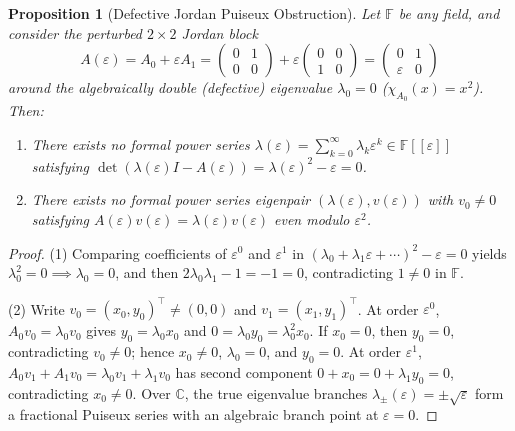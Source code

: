 \documentclass[11pt,a4paper]{article}
\newtheorem{proposition}[theorem]{Proposition}
\theoremstyle{definition}
\begin{document}
\begin{proposition}[Defective Jordan Puiseux Obstruction]\label{prop:defective}
Let $\mathbb{F}$ be any field, and consider the perturbed $2 \times 2$ Jordan block
\[
  A(\varepsilon) = A_0 + \varepsilon A_1
  = \begin{pmatrix} 0 & 1 \\ 0 & 0 \end{pmatrix}
  + \varepsilon \begin{pmatrix} 0 & 0 \\ 1 & 0 \end{pmatrix}
  = \begin{pmatrix} 0 & 1 \\ \varepsilon & 0 \end{pmatrix}
\]
around the algebraically double (defective) eigenvalue $\lambda_0 = 0$
($\chi_{A_0}(x) = x^2$). Then:
\begin{enumerate}
  \item There exists no formal power series $\lambda(\varepsilon) = \sum_{k=0}^\infty
  \lambda_k \varepsilon^k \in \mathbb{F}[[\varepsilon]]$ satisfying
  $\det(\lambda(\varepsilon) I - A(\varepsilon)) = \lambda(\varepsilon)^2 - \varepsilon = 0$.
  \item There exists no formal power series eigenpair $(\lambda(\varepsilon), v(\varepsilon))$
  with $v_0 \neq 0$ satisfying $A(\varepsilon) v(\varepsilon) = \lambda(\varepsilon)
  v(\varepsilon)$ even modulo $\varepsilon^2$.
\end{enumerate}
\end{proposition}

\begin{proof}
(1) Comparing coefficients of $\varepsilon^0$ and $\varepsilon^1$ in
$(\lambda_0 + \lambda_1 \varepsilon + \cdots)^2 - \varepsilon = 0$ yields
$\lambda_0^2 = 0 \implies \lambda_0 = 0$, and then $2 \lambda_0 \lambda_1 - 1 = -1 = 0$,
contradicting $1 \neq 0$ in $\mathbb{F}$.

(2) Write $v_0 = (x_0, y_0)^\top \neq (0, 0)$ and $v_1 = (x_1, y_1)^\top$. At order
$\varepsilon^0$, $A_0 v_0 = \lambda_0 v_0$ gives $y_0 = \lambda_0 x_0$ and
$0 = \lambda_0 y_0 = \lambda_0^2 x_0$. If $x_0 = 0$, then $y_0 = 0$, contradicting
$v_0 \neq 0$; hence $x_0 \neq 0$, $\lambda_0 = 0$, and $y_0 = 0$. At order
$\varepsilon^1$, $A_0 v_1 + A_1 v_0 = \lambda_0 v_1 + \lambda_1 v_0$ has second
component $0 + x_0 = 0 + \lambda_1 y_0 = 0$, contradicting $x_0 \neq 0$. Over
$\mathbb{C}$, the true eigenvalue branches $\lambda_\pm(\varepsilon) =
\pm\sqrt{\varepsilon}$ form a fractional Puiseux series with an algebraic branch point
at $\varepsilon = 0$.
\end{proof}
\end{document}
